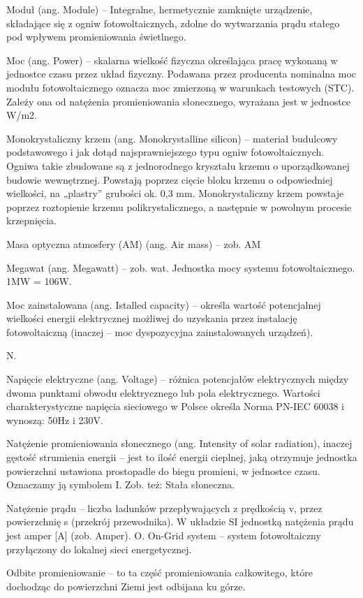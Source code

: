 \documentclass[12pt,a4paper]{article}
\begin{document}
Moduł (ang. Module) – Integralne, hermetycznie zamknięte urządzenie, składające się z ogniw fotowoltaicznych, zdolne do wytwarzania prądu stałego pod wpływem promieniowania świetlnego.

Moc (ang. Power) – skalarna wielkość fizyczna określająca pracę wykonaną w jednostce czasu przez układ fizyczny. Podawana przez producenta nominalna moc modułu fotowoltaicznego oznacza moc zmierzoną w warunkach testowych (STC). Zależy ona od natężenia promieniowania słonecznego, wyrażana jest w jednostce W/m2.

Monokrystaliczny krzem (ang. Monokrystalline silicon) – materiał budulcowy podstawowego i jak dotąd najsprawniejszego typu ogniw fotowoltaicznych. Ogniwa takie zbudowane są z jednorodnego kryształu krzemu o uporządkowanej budowie wewnętrznej. Powstają poprzez cięcie bloku krzemu o odpowiedniej wielkości, na „plastry” grubości ok. 0,3 mm. Monokrystaliczny krzem powstaje poprzez roztopienie krzemu polikrystalicznego, a następnie w powolnym procesie krzepnięcia.

Masa optyczna atmosfery (AM) (ang. Air mass) – zob. AM

Megawat (ang. Megawatt) – zob. wat. Jednostka mocy systemu fotowoltaicznego. 1MW = 106W.

Moc zainstalowana (ang. Istalled capacity) – określa wartość potencjalnej wielkości energii elektrycznej możliwej do uzyskania przez instalację fotowoltaiczną (inaczej – moc dyspozycyjna zainstalowanych urządzeń).

 

N.

Napięcie elektryczne (ang. Voltage) – różnica potencjałów elektrycznych między dwoma punktami obwodu elektrycznego lub pola elektrycznego. Wartości charakterystyczne napięcia sieciowego w Polsce określa Norma  PN-IEC 60038 i wynoszą: 50Hz i 230V.

Natężenie promieniowania słonecznego (ang. Intensity of solar radiation), inaczej gęstość strumienia energii – jest to ilość energii cieplnej, jaką otrzymuje jednostka powierzchni ustawiona prostopadle do biegu promieni, w jednostce czasu. Oznaczamy ją symbolem I. Zob. też: Stała słoneczna.

Natężenie prądu – liczba ładunków przepływających z prędkością v, przez powierzchnię s (przekrój przewodnika). W układzie SI jednostką natężenia prądu jest amper [A] (zob. Amper).
O.
On-Grid system – system fotowoltaiczny przyłączony do lokalnej sieci energetycznej.

Odbite promieniowanie – to ta część promieniowania całkowitego, które dochodząc do powierzchni Ziemi jest odbijana ku górze.
\end{document}
